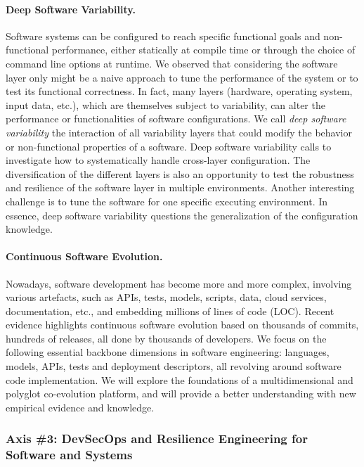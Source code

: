 \paragraph{Deep Software Variability.} Software systems can be configured to reach specific functional goals and non-functional performance, either statically at compile time or through the choice of command line options at runtime. We observed that considering the software layer only might be a naive approach to tune the performance of the system or to test its functional correctness.  In fact, many layers (hardware, operating system, input data, etc.), which are themselves subject to variability, can alter the performance or functionalities of software configurations. We call \emph{deep software variability} the interaction of all variability layers that could modify the behavior or non-functional properties of a software. Deep software variability calls to investigate how to systematically handle cross-layer configuration. The diversification of the different layers is also an opportunity to test the robustness and resilience of the software layer in multiple environments. Another interesting challenge is to tune the software for one specific executing environment. In essence, deep software variability questions the generalization of the configuration knowledge. 

\paragraph{Continuous Software Evolution.} Nowadays, software development has become more and more complex, involving various artefacts, such as APIs, tests, models, scripts, data, cloud services, documentation, etc., and embedding millions of lines of code (LOC). Recent evidence highlights continuous software evolution based on thousands of commits, hundreds of releases, all done by thousands of developers. We focus on the following essential backbone dimensions in software engineering: languages, models, APIs, tests and deployment descriptors, all revolving around software code implementation.  We will explore the foundations of a multidimensional and polyglot co-evolution platform, and will provide a better understanding with new empirical evidence and knowledge. 

	
		\subsubsection{Axis \#3: DevSecOps and Resilience Engineering for Software and Systems} \label{ sec:future-axis3-DevSecOps}

